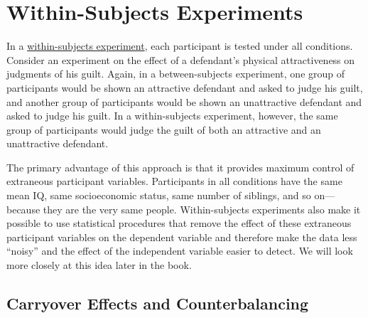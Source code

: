 \documentclass[
]{krantz}
\begin{document}
\section{Within-Subjects Experiments}\label{within-subjects-experiments}

In a \hyperref[within-subjects-experiment]{within-subjects experiment}, each participant is tested under all conditions. Consider an experiment on the effect of a defendant's physical attractiveness on judgments of his guilt. Again, in a between-subjects experiment, one group of participants would be shown an attractive defendant and asked to judge his guilt, and another group of participants would be shown an unattractive defendant and asked to judge his guilt. In a within-subjects experiment, however, the same group of participants would judge the guilt of both an attractive and an unattractive defendant.

The primary advantage of this approach is that it provides maximum control of extraneous participant variables. Participants in all conditions have the same mean IQ, same socioeconomic status, same number of siblings, and so on---because they are the very same people. Within-subjects experiments also make it possible to use statistical procedures that remove the effect of these extraneous participant variables on the dependent variable and therefore make the data less ``noisy'' and the effect of the independent variable easier to detect. We will look more closely at this idea later in the book.

\subsection*{Carryover Effects and Counterbalancing}\label{carryover-effects-and-counterbalancing}
\end{document}
